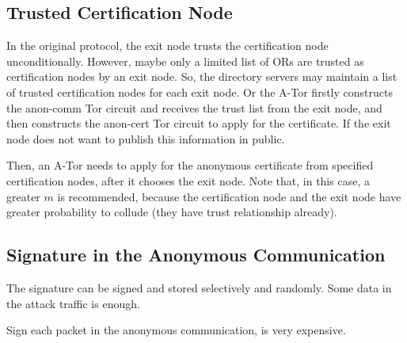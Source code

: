 
\subsection{Trusted Certification Node}

In the original protocol,
  the exit node trusts the certification node unconditionally.
However,
  maybe only a limited list of ORs are trusted as certification nodes by an exit node.
So,
  the directory servers may maintain a list of trusted certification nodes for each exit node.
Or
  the A-Tor firstly constructs the anon-comm Tor circuit and receives the trust list from the exit node,
  and then constructs the anon-cert Tor circuit to apply for the certificate.
If the exit node does not want to publish this information in public.

Then,
  an A-Tor needs to apply for the anonymous certificate from specified certification nodes,
  after it chooses the exit node.
Note that,
  in this case,
  a greater $m$ is recommended,
  because the certification node and the exit node have greater probability to collude
  (they have trust relationship already).




\subsection{Signature in the Anonymous Communication}

The signature can be signed and stored selectively and randomly.
Some data in the attack traffic is enough.

Sign each packet in the anonymous communication,
  is very expensive.

